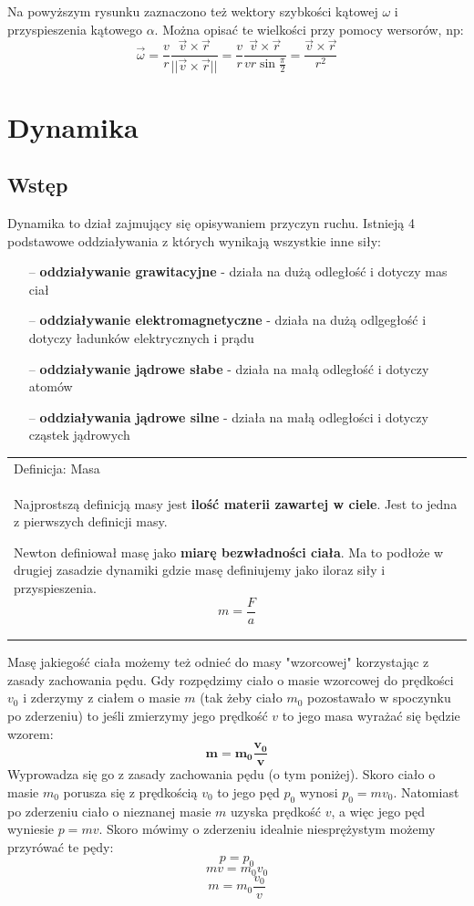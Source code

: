 \documentclass[a4paper]{article}
\newenvironment{definition}[2][Definicja]
    {
        \begin{center}
        \begin{tabular}{|p{1\textwidth}|}
        \hline
            #1: #2\\[2ex]
        \begin{em}
        \Large
    }
    { 
        \end{em}
        \\\hline
        \end{tabular} 
        \end{center}
    }
\begin{document}
    Na powyższym rysunku zaznaczono też wektory szybkości kątowej $\omega$ i przyspieszenia kątowego $\alpha$. Można opisać te wielkości przy pomocy wersorów, np:
    \[\vec{\omega} = \frac{v}{r}\frac{\vec{v} \times \vec{r}}{||\vec{v} \times \vec{r}||} = 
    \frac{v}{r}\frac{\vec{v} \times \vec{r}}{vr\sin{\frac{\pi}{2}}} = \frac{\vec{v} \times \vec{r}}{r^2}\]

    \pagebreak
    
    \section{\huge Dynamika}
    \subsection{\LARGE Wstęp}
    \Large
    Dynamika to dział zajmujący się opisywaniem przyczyn ruchu. Istnieją 4 podstawowe oddziaływania z 
    których wynikają wszystkie inne siły:
    \begin{itemize}
        \item [--] \textbf{oddziaływanie grawitacyjne} - działa na dużą odległość i dotyczy mas ciał
        \item [--] \textbf{oddziaływanie elektromagnetyczne} - działa na dużą odlgegłość i dotyczy ładunków elektrycznych i prądu
        \item [--] \textbf{oddziaływanie jądrowe słabe} - działa na małą odległość i dotyczy atomów
        \item [--] \textbf{oddziaływania jądrowe silne} - działa na małą odległości i dotyczy cząstek jądrowych
    \end{itemize}
    
    \begin{definition}{Masa}
        Najprostszą definicją masy jest \textbf{ilość materii zawartej w ciele}. Jest to jedna z 
        pierwszych definicji masy.
        
        Newton definiował masę jako \textbf{miarę bezwładności ciała}. Ma to podłoże w 
        drugiej zasadzie dynamiki gdzie masę definiujemy jako iloraz siły i przyspieszenia.
        \[m = \frac{F}{a}\]
    \end{definition}  
    Masę jakiegość ciała możemy też odnieć do masy "wzorcowej" korzystając z zasady
    zachowania pędu. Gdy rozpędzimy ciało o masie wzorcowej do prędkości $v_0$ i zderzymy
    z ciałem o masie $m$ (tak żeby ciało $m_0$ pozostawało w spoczynku po zderzeniu) to jeśli
    zmierzymy jego prędkość $v$ to jego masa wyrażać się będzie wzorem:
    \[\mathbf{m = m_0\frac{v_0}{v}}\]
    Wyprowadza się go z zasady zachowania pędu (o tym poniżej). Skoro ciało o masie $m_0$ 
    porusza się z prędkością $v_0$ to jego pęd $p_0$ wynosi $p_0 = mv_0$. Natomiast po zderzeniu
    ciało o nieznanej masie $m$ uzyska prędkość $v$, a więc jego pęd wyniesie $p = mv$.
    Skoro mówimy o zderzeniu idealnie niesprężystym możemy przyrówać te pędy:
    \[ p = p_0\]
    \[ mv = m_0v_0\]
    \[ m = m_0 \frac{v_0}{v}\]
\end{document}
